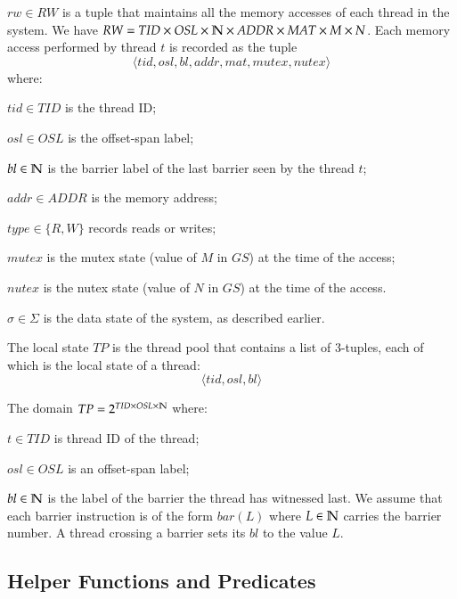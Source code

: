 \begin{compactitem}
\item $rw\in RW$ is a tuple that maintains all the memory accesses of each
  thread in the system.
  We have
  $RW = TID\times OSL \times \mathbb{N} \times ADDR \times MAT \times M\times N$.
  Each memory access performed by thread $t$ is recorded as the tuple
  \[ \langle tid, osl, bl, addr, mat, mutex, nutex \rangle \] where:
  \begin{compactitem}
  \item $tid\in TID$ is the thread ID;
  \item $osl\in OSL$ is the offset-span label;
  \item $bl\in \mathbb{N}$ is the barrier label of the last barrier seen by the thread
    $t$;
  \item $addr\in ADDR$ is the memory address;
  \item $type\in\{R,W\}$ records reads or writes;
  \item $mutex$ is the mutex state (value of $M$ in $GS$) at the time of the
    access;
  \item $nutex$ is the nutex state (value of $N$ in $GS$) at the time of the
    access.
  \end{compactitem}

\item $\sigma\in\Sigma$ is the data state of the system, as described earlier.
\end{compactitem}

\vspace{2ex}

The local state $TP$ is the thread pool that contains a list of 3-tuples, each
of which is the local state of a thread:
\[ \langle tid, osl, bl \rangle \]

The domain $TP=2^{TID\times OSL\times \mathbb{N}}$ where:

\begin{compactitem}
\item $t\in TID$ is thread ID of the thread;
\item $osl\in OSL$ is an offset-span label;
\item $bl\in\mathbb{N}$ is the label of the barrier the thread has witnessed last.
  We assume that each barrier instruction is of the form $bar(L)$ where
  $L\in\mathbb{N}$ carries the barrier number.
  A thread crossing a barrier sets its $bl$ to the value $L$.
\end{compactitem}

\subsection{Helper Functions and Predicates}
\label{subsec:helper}

